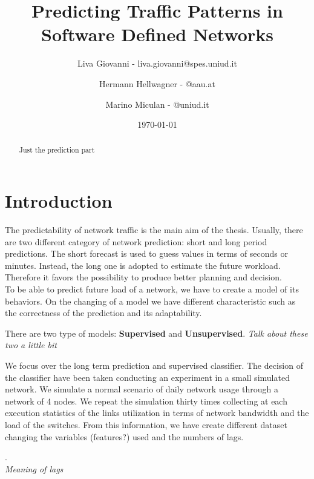\documentclass[12pt]{article}
\title{Predicting Traffic Patterns in\\ Software Defined Networks}
\author{
	Liva Giovanni - liva.giovanni@spes.uniud.it
	\and
	Hermann Hellwagner - @aau.at
	\and
	Marino Miculan - @uniud.it
}
\date{\today}
\begin{document}
	
\maketitle

\begin{abstract}
	Just the prediction part
\end{abstract}

\newpage

\section{Introduction}
The predictability of network traffic is the main aim of the thesis. 
Usually, there are two different category of network prediction: short and long period predictions.
The short forecast is used to guess values in terms of seconds or minutes. 
Instead, the long one is adopted to estimate the future workload. 
Therefore it favors the possibility to produce better planning and decision.\\
To be able to predict future load of a network, we have to create a model of its behaviors. 
On the changing of a model we have different characteristic such as the correctness of the prediction and its adaptability.


There are two type of models: \textbf{Supervised} and \textbf{Unsupervised}.
\textit{Talk about these two a little bit}

We focus over the long term prediction and supervised classifier.
The decision of the classifier have been taken conducting an experiment in a small simulated network. 
We simulate a normal scenario of daily network usage through a network of 4 nodes. 
We repeat the simulation thirty times collecting at each execution statistics of the links utilization in terms of network bandwidth and the load of the switches.
From this information, we have create different dataset changing the variables (features?) used and the numbers of lags.

.\\



\textit{Meaning of lags}

\end{document}
